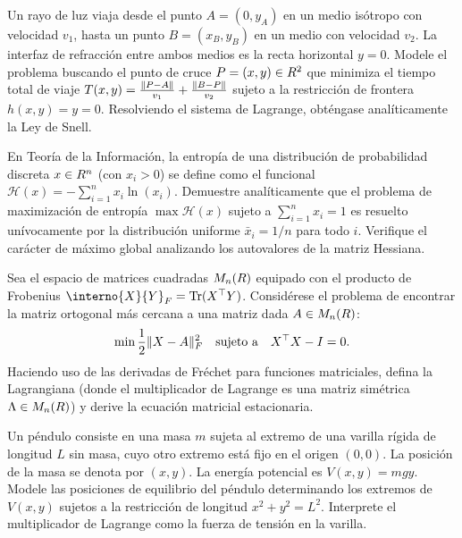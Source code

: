 \begin{exercise}\label{v1:ejer:2.19}
 Un rayo de luz viaja desde el punto $A = (0, y_A)$ en un medio isótropo con velocidad $v_1$, hasta un punto $B = (x_B, y_B)$ en un medio con velocidad $v_2$. La interfaz de refracción entre ambos medios es la recta horizontal $y = 0$. Modele el problema buscando el punto de cruce $P = (x, y) \in R^2$ que minimiza el tiempo total de viaje $T(x, y) = \frac{\lVert P - A\rVert}{v_1} + \frac{\lVert B - P\rVert}{v_2}$ sujeto a la restricción de frontera $h(x,y) = y = 0$. Resolviendo el sistema de Lagrange, obténgase analíticamente la Ley de Snell.
\end{exercise}

\begin{exercise}\label{v1:ejer:2.20}
 En Teoría de la Información, la entropía de una distribución de probabilidad discreta $x \in R^n$ (con $x_i > 0$) se define como el funcional $\mathcal{H}(x) = -\sum_{i=1}^n x_i \ln(x_i)$. Demuestre analíticamente que el problema de maximización de entropía $\max \mathcal{H}(x)$ sujeto a $\sum_{i=1}^n x_i = 1$ es resuelto unívocamente por la distribución uniforme $\bar{x}_i = 1/n$ para todo $i$. Verifique el carácter de máximo global analizando los autovalores de la matriz Hessiana.
\end{exercise}

\begin{exercise}\label{v1:ejer:2.21}
 Sea el espacio de matrices cuadradas $M_n(R)$ equipado con el producto de Frobenius $\interno{X}{Y}_F = \Tr(X^\top Y)$. Considérese el problema de encontrar la matriz ortogonal más cercana a una matriz dada $A \in M_n(R)$:
 \[
 \min \frac{1}{2} \lVert X - A\rVert_F^2 \quad \text{sujeto a} \quad X^\top X - I = 0.
 \]
 Haciendo uso de las derivadas de Fréchet para funciones matriciales, defina la Lagrangiana (donde el multiplicador de Lagrange es una matriz simétrica $\Lambda \in M_n(R)$) y derive la ecuación matricial estacionaria.
\end{exercise}

\begin{exercise}\label{v1:ejer:2.22}
 Un péndulo consiste en una masa $m$ sujeta al extremo de una varilla rígida de longitud $L$ sin masa, cuyo otro extremo está fijo en el origen $(0,0)$. La posición de la masa se denota por $(x,y)$. La energía potencial es $V(x,y) = mgy$. Modele las posiciones de equilibrio del péndulo determinando los extremos de $V(x,y)$ sujetos a la restricción de longitud $x^2 + y^2 = L^2$. Interprete el multiplicador de Lagrange como la fuerza de tensión en la varilla.
\end{exercise}

